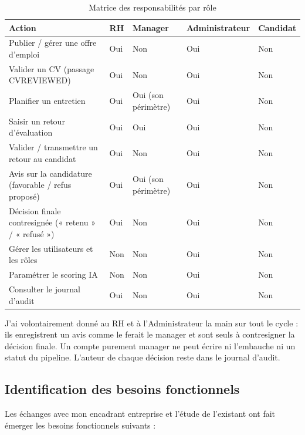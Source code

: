 \documentclass[]{./tpl/isipfe}
\def\_{\textunderscore\allowbreak}
\begin{document}
\setcounter{table}{0}
\begin{table}[!ht]
\centering
\caption{Matrice des responsabilités par rôle}
\label{tab_2_1}
\renewcommand{\arraystretch}{1.25}\footnotesize
\setlength{\tabcolsep}{4pt}%
\begin{tabular}{|P{0.441\textwidth}|P{0.093\textwidth}|P{0.104\textwidth}|P{0.181\textwidth}|P{0.093\textwidth}|}
\hline
\textbf{Action} & \textbf{RH} & \textbf{Manager} & \textbf{Administrateur} & \textbf{Candidat} \\
\hline
Publier / gérer une offre d’emploi & Oui & Non & Oui & Non \\
\hline
Valider un CV (passage CV\_REVIEWED) & Oui & Non & Oui & Non \\
\hline
Planifier un entretien & Oui & Oui (son périmètre) & Oui & Non \\
\hline
Saisir un retour d’évaluation & Oui & Oui & Oui & Non \\
\hline
Valider / transmettre un retour au candidat & Oui & Non & Oui & Non \\
\hline
Avis sur la candidature (favorable / refus proposé) & Oui & Oui (son périmètre) & Oui & Non \\
\hline
Décision finale contresignée (« retenu » / « refusé ») & Oui & Non & Oui & Non \\
\hline
Gérer les utilisateurs et les rôles & Non & Non & Oui & Non \\
\hline
Paramétrer le scoring IA & Non & Non & Oui & Non \\
\hline
Consulter le journal d’audit & Oui & Non & Oui & Non \\
\hline
\end{tabular}
\end{table}
J’ai volontairement donné au RH et à l’Administrateur la main sur tout le cycle : ils enregistrent un avis comme le ferait le manager et sont seuls à contresigner la décision finale. Un compte purement manager ne peut écrire ni l’embauche ni un statut du pipeline. L’auteur de chaque décision reste dans le journal d’audit.

\subsection{Identification des besoins fonctionnels}
\label{sec_2_2_2}
Les échanges avec mon encadrant entreprise et l’étude de l’existant ont fait émerger les besoins fonctionnels suivants :
\end{document}
